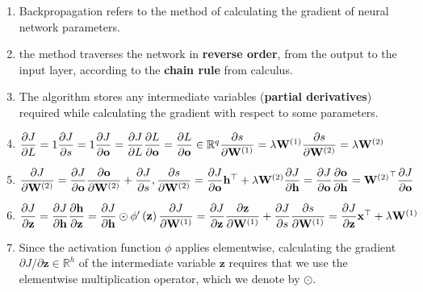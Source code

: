 \begin{enumerate}[itemsep=0.2cm]
    \item Backpropagation refers to the method of calculating the gradient of neural network parameters.

    \item the method traverses the network in \textbf{reverse order}, from the output to the input layer, according to the \textbf{chain rule} from calculus. 
    
    \item The algorithm stores any intermediate variables (\textbf{partial derivatives}) required while calculating the gradient with respect to some parameters.

    \item[] 
    $
        \dfrac{\partial J}{\partial L} = 1
        \hfill
        \dfrac{\partial J}{\partial s} = 1
        \hfill
        \dfrac{\partial J}{\partial \mathbf{o}}
        = \dfrac{\partial J}{\partial L}\dfrac{\partial L}{\partial \mathbf{o}}
        = \dfrac{\partial L}{\partial \mathbf{o}}
        \in \mathbb{R}^q
        \hfill
        \dfrac{\partial s}{\partial \mathbf{W}^{(1)}} = \lambda \mathbf{W}^{(1)}
        \hfill
        \dfrac{\partial s}{\partial \mathbf{W}^{(2)}} = \lambda \mathbf{W}^{(2)}
    $

    \item[] 
    $
        \dfrac{\partial J}{\partial \mathbf{W}^{(2)}}
        = \dfrac{\partial J}{\partial \mathbf{o}}\dfrac{\partial \mathbf{o}}{\partial \mathbf{W}^{(2)}}
        + \dfrac{\partial J}{\partial s}, \dfrac{\partial s}{\partial \mathbf{W}^{(2)}}
        = \dfrac{\partial J}{\partial \mathbf{o}} \mathbf{h}^\top + \lambda \mathbf{W}^{(2)}
        \hfill
        \dfrac{\partial J}{\partial \mathbf{h}}
        = \dfrac{\partial J}{\partial \mathbf{o}} \dfrac{\partial \mathbf{o}}{\partial \mathbf{h}}
        = {\mathbf{W}^{(2)}}^\top \dfrac{\partial J}{\partial \mathbf{o}}
    $

    \item[] 
    $
        \dfrac{\partial J}{\partial \mathbf{z}}
        = \dfrac{\partial J}{\partial \mathbf{h}} \dfrac{\partial \mathbf{h}}{\partial \mathbf{z}}
        = \dfrac{\partial J}{\partial \mathbf{h}} \odot \phi'\left(\mathbf{z}\right)
        \hfill
        \dfrac{\partial J}{\partial \mathbf{W}^{(1)}}
        = \dfrac{\partial J}{\partial \mathbf{z}} \dfrac{\partial \mathbf{z}}{\partial \mathbf{W}^{(1)}}
        + \dfrac{\partial J}{\partial s} \dfrac{\partial s}{\partial \mathbf{W}^{(1)}}
        = \dfrac{\partial J}{\partial \mathbf{z}} \mathbf{x}^\top + \lambda \mathbf{W}^{(1)}
    $

    \item Since the activation function $\phi$ applies elementwise, calculating the gradient $\partial J/\partial \mathbf{z} \in \mathbb{R}^h$ of the intermediate variable $\mathbf{z}$ requires that we use the elementwise multiplication operator, which we denote by $\odot$.

    
\end{enumerate}


